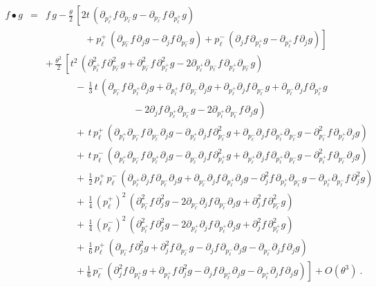 \documentclass[11pt,a4paper]{article}
\def\d{\partial}
\begin{document}
\begin{eqnarray}
  \label{eq:weyl:positionspace}
  f\bullet g&=&f\,g-\frac\theta2\,\left[
  2t\,\left(\d_{p_\ell^+}f\,\d_{p_\ell^-}g
  - \d_{p_\ell^-}f\,\d_{p_\ell^+}g\right)\right.\\\nonumber
  &&\qquad\qquad+\left.p_\ell^+\,\left(\d_{p_\ell^-}f\,\d_j g
  - \d_j f\,\d_{p_\ell^-}g\right)+ p_\ell^-\,\left(\d_j f\,\d_{p_\ell^+}g
   - \d_{p_\ell^+}f\,\d_j g\right)\right]\\ \nonumber
  &&+\,\frac{\theta^2}{2}\,\left[t^2\,
  \left(\d_{p_\ell^+}^2f\,\d_{p_\ell^-}^2g
  +\d_{p_\ell^-}^2f\,\d_{p_\ell^+}^2g
  -2\d_{p_\ell^+}\d_{p_\ell^-}f\,\d_{p_\ell^+}\d_{p_\ell^-}g
  \right)\right.\\ \nonumber &&\qquad\quad
  -\,\mbox{$\frac13$}\,t\,\left(\d_{p_\ell^-}f\,\d_{p_\ell^+}\d_j g
  +\d_{p_\ell^+}f\,\d_{p_\ell^-}\d_j g
  +\d_{p_\ell^+}\d_j f\,\d_{p_\ell^-}g
  +\d_{p_\ell^-}\d_j f\,\d_{p_\ell^+}g\right.\\ \nonumber
  &&\qquad\qquad\qquad\qquad\quad-\left.2\partial_jf\,\partial_{p_\ell^+}
  \partial_{p_\ell^-}g-2\partial_{p_\ell^+}\partial_{p_\ell^-}f\,
  \partial_jg\right)\\\nonumber&&\qquad\quad
  +\,t\,p_\ell^+\,\left(\d_{p_\ell^+}\d_{p_\ell^-}f\,\d_{p_\ell^-}\d_j g
  -\d_{p_\ell^+}\d_j f\,\d_{p_\ell^-}^2g
  +\d_{p_\ell^-}\d_j f\,\d_{p_\ell^+}\d_{p_\ell^-}g
  -\d_{p_\ell^-}^2f\,\d_{p_\ell^+}\d_j g\right)
  \\ \nonumber &&\qquad\quad
  +\,t\,p_\ell^-\,\left(\d_{p_\ell^+}\d_{p_\ell^-}f\,\d_{p_\ell^+}\d_j g
  -\d_{p_\ell^-}\d_j f\,\d_{p_\ell^+}^2g
  +\d_{p_\ell^+}\d_j f\,\d_{p_\ell^+}\d_{p_\ell^-}g
  -\d_{p_\ell^+}^2f\,\d_{p_\ell^-}\d_j g\right)\\ \nonumber
  &&\qquad\quad
  +\,\mbox{$\frac12$}\,p_\ell^+\,p_\ell^-\,\left(
  \d_{p_\ell^+}\d_j f\,\d_{p_\ell^-}\d_j g
  +\d_{p_\ell^-}\d_j f\,\d_{p_\ell^+}\d_j g
  -\d_j ^2f\,\d_{p_\ell^+}\d_{p_\ell^-}g
  -\d_{p_\ell^+}\d_{p_\ell^-}f\,\d_j^2g\right)
  \\ \nonumber &&\qquad\quad
  +\,\mbox{$\frac14$}\,\left(p_\ell^+\right)^2\,
  \left(\d_{p_\ell^-}^2f\,\d_j^2g
  -2\d_{p_\ell^-}\d_j f\,\d_{p_\ell^-}\d_j g
  +\d_j^2f\,\d_{p_\ell^-}^2g\right)\\ \nonumber &&\qquad\quad
  +\,\mbox{$\frac14$}\,\left(p_\ell^-\right)^2\,
  \left(\d_{p_\ell^+}^2f\,\d_j^2g
  -2\d_{p_\ell^+}\d_j f\,\d_{p_\ell^+}\d_j g
  +\d_j^2f\,\d_{p_\ell^+}^2g\right)
  \\ \nonumber &&\qquad\quad
  +\,\mbox{$\frac16$}\,p_\ell^+\,\left(\d_{p_\ell^-}f\,\d_j^2g
  +\d_j^2f\,\d_{p_\ell^-}g-\partial_jf\,\partial_{p_\ell^-}
  \partial_jg-\partial_{p_\ell^-}\partial_jf\,\partial_jg\right)
  \\&&\qquad\quad
  +\left.\mbox{$\frac16$}\,p_\ell^-\,\left(\d_j^2f\,\d_{p_\ell^+}g
  +\d_{p_\ell^+}f\,\d_j^2g-\partial_jf\,\partial_{p_\ell^+}\d_jg-
  \d_{p_\ell^+}\d_jf\,\d_jg\right)
  \right]+O\left(\theta^3\right) \ .
\end{eqnarray}
\end{document}
